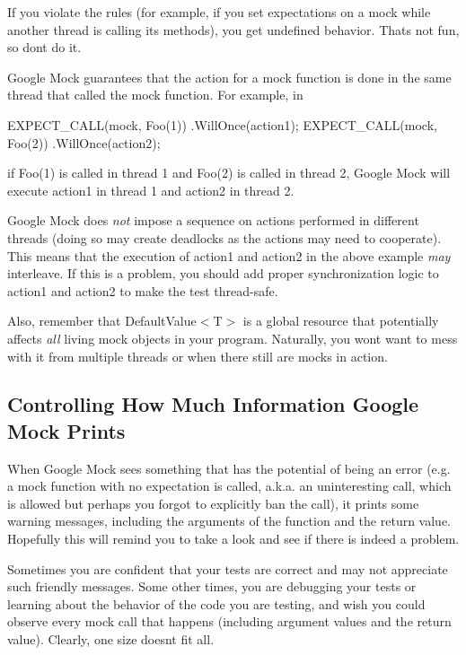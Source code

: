 If you violate the rules (for example, if you set expectations on a mock while another thread is calling its methods), you get undefined behavior. That\textquotesingle{}s not fun, so don\textquotesingle{}t do it.

Google Mock guarantees that the action for a mock function is done in the same thread that called the mock function. For example, in


\begin{DoxyCode}
EXPECT\_CALL(mock, Foo(1))
    .WillOnce(action1);
EXPECT\_CALL(mock, Foo(2))
    .WillOnce(action2);
\end{DoxyCode}


if {\ttfamily Foo(1)} is called in thread 1 and {\ttfamily Foo(2)} is called in thread 2, Google Mock will execute {\ttfamily action1} in thread 1 and {\ttfamily action2} in thread 2.

Google Mock does {\itshape not} impose a sequence on actions performed in different threads (doing so may create deadlocks as the actions may need to cooperate). This means that the execution of {\ttfamily action1} and {\ttfamily action2} in the above example {\itshape may} interleave. If this is a problem, you should add proper synchronization logic to {\ttfamily action1} and {\ttfamily action2} to make the test thread-\/safe.

Also, remember that {\ttfamily Default\+Value$<$T$>$} is a global resource that potentially affects {\itshape all} living mock objects in your program. Naturally, you won\textquotesingle{}t want to mess with it from multiple threads or when there still are mocks in action.

\subsection*{Controlling How Much Information Google Mock Prints}

When Google Mock sees something that has the potential of being an error (e.\+g. a mock function with no expectation is called, a.\+k.\+a. an uninteresting call, which is allowed but perhaps you forgot to explicitly ban the call), it prints some warning messages, including the arguments of the function and the return value. Hopefully this will remind you to take a look and see if there is indeed a problem.

Sometimes you are confident that your tests are correct and may not appreciate such friendly messages. Some other times, you are debugging your tests or learning about the behavior of the code you are testing, and wish you could observe every mock call that happens (including argument values and the return value). Clearly, one size doesn\textquotesingle{}t fit all.

